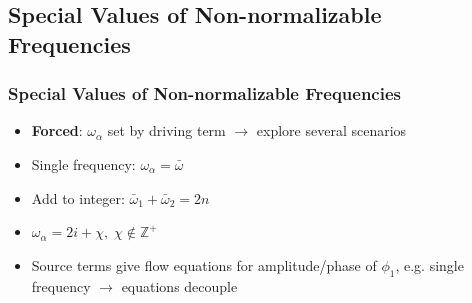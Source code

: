 \documentclass[mathserif,10pt]{beamer}
\newcommand{\bi}{\begin{itemize}}
\newcommand{\ei}{\end{itemize}}
\newcommand{\its}{\item}
\begin{document}
{%

\subsection{Special Values of Non-normalizable Frequencies}
\frame
{
  \frametitle{Special Values of Non-normalizable Frequencies}
  \vspace{-0.5in}
  \bi
  \its<1->{{\bf Forced}: $\omega_\alpha$ set by driving term $\to$ explore several scenarios}
  \its<2->{\alert<2>{Single frequency}: $\omega_\alpha = \bar\omega$}
  \its<3->{\alert<3>{Add to integer}: $\bar\omega_1 + \bar\omega_2 = 2n$}
  \its<4->{$\omega_\alpha = 2i + \chi, \; \chi \notin \mathbb{Z}^+$}
  \its<4->{Source terms give flow equations for amplitude/phase of $\phi_1$, e.g. single frequency $\to$ equations decouple}
  \ei

}}
\end{document}
